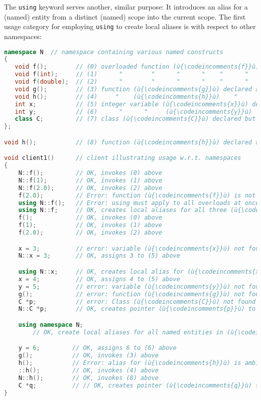 The \texttt{using} keyword serves another, similar purpose: It introduces an
alias for a (named) entity from a distinct (named) scope into the
current scope. The first usage category for employing \texttt{using} to
create local aliases is with respect to other namespaces:

\begin{lstlisting}[language=C++]
namespace N  // namespace containing various named constructs
{
   void f();        // (0) overloaded function (ù{\codeincomments{f}}ù) declared at namespace scope
   void f(int);     // (1)      "        "      "      "    "      "       "
   void f(double);  // (2)      "        "      "      "    "      "       "
   void g();        // (3) function (ù{\codeincomments{g}}ù) declared at namespace scope
   void h();        // (4)     "    (ù{\codeincomments{h}}ù)    "      "     "       "
   int x;           // (5) integer variable (ù{\codeincomments{x}}ù) declared at namespace scope
   int y;           // (6)      "      "     (ù{\codeincomments{y}}ù)     "     "     "      "
   class C;         // (7) class (ù{\codeincomments{C}}ù) declared but not defined at namespace scope
};

void h();           // (8) function (ù{\codeincomments{h}}ù) declared at file (aka global) scope

void client1()      // client illustrating usage w.r.t. namespaces
{
    N::f();         // OK, invokes (0) above
    N::f(1);        // OK, invokes (1) above
    N::f(2.0);      // OK, invokes (2) above
    f(2.0);         // Error: function (ù{\codeincomments{f}}ù) is not found.
    using N::f();   // Error: using must apply to all overloads at once.
    using N::f;     // OK, creates local aliases for all three (ù{\codeincomments{f}}ù) overloads
    f();            // OK, invokes (0) above
    f(1);           // OK, invokes (1) above
    f(2.0);         // OK, invokes (2) above

    x = 3;          // error: variable (ù{\codeincomments{x}}ù) not found
    N::x = 3;       // OK, assigns 3 to (5) above

    using N::x;     // OK, creates local alias for (ù{\codeincomments{x}}ù)
    x = 4;          // OK, assigns 4 to (5) above
    y = 5;          // error: variable (ù{\codeincomments{y}}ù) not found
    g();            // error: function (ù{\codeincomments{g}}ù) not found
    C *p;           // error: Class (ù{\codeincomments{C}}ù) not found
    N::C *p;        // OK, creates pointer (ù{\codeincomments{p}}ù) to incomplete type (ù{\codeincomments{C}}ù) (8) above

    using namespace N;
        // OK, create local aliases for all named entities in (ù{\codeincomments{namespace}}ù) (ù{\codeincomments{N}}ù).

    y = 6;         // OK, assigns 6 to (6) above
    g();           // OK, invokes (3) above
    h();           // Error: alias for (ù{\codeincomments{h}}ù) is ambiguous; (4) or (8) above.
    ::h();         // OK, invokes (4) above
    N::h();        // OK, invokes (8) above
    C *q;          // // OK, creates pointer (ù{\codeincomments{q}}ù) to incomplete type (ù{\codeincomments{C}}ù) (8) above
}
\end{lstlisting}

